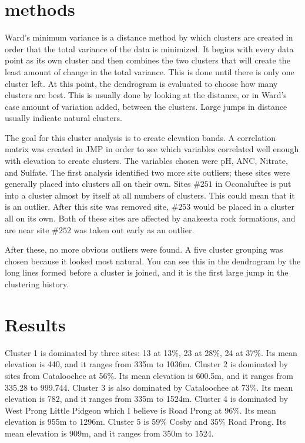 \documentclass[11pt]{article} %
\begin{document}
\section{methods}
Ward’s minimum variance is a distance method by which clusters are created in order that the total variance of the data is minimized.  It begins with every data point as its own cluster and then combines the two clusters that will create the least amount of change in the total variance.  This is done until there is only one cluster left.  At this point, the dendrogram is evaluated to choose how many clusters are best.  This is usually done by looking at the distance, or in Ward’s case amount of variation added, between the clusters.  Large jumps in distance usually indicate natural clusters.

The goal for this cluster analysis is to create elevation bands.  A correlation matrix was created in JMP in order to see which variables correlated well enough with elevation to create clusters.  The variables chosen were pH, ANC, Nitrate, and Sulfate.   The first analysis identified two more site outliers; these sites were generally placed into clusters all on their own.  Sites $\#251$ in Oconaluftee is put into a cluster almost by itself at all numbers of clusters.  This could mean that it is an outlier.  After this site was removed site, $\#253$ would be placed in a cluster all on its own.  Both of these sites are affected by anakeesta rock formations, and are near site $\#252$ was taken out early as an outlier.

After these, no more obvious outliers were found.  A five cluster grouping was chosen because it looked most natural.  You can see this in the dendrogram by the long lines formed before a cluster is joined, and it is the first large jump in the clustering history.

\section{Results}%
Cluster 1 is dominated by three sites: 13 at 13$\%$, 23 at 28$\%$, 24 at 37$\%$.  Its mean elevation is 440, and it ranges from 335m to 1036m.  Cluster 2 is dominated by sites from Cataloochee at 56$\%$.  Its mean elevation is 600.5m, and it ranges from 335.28 to 999.744.  Cluster 3 is also dominated by Cataloochee at 73$\%$. Its mean elevation is 782, and it ranges from 335m to 1524m.  Cluster 4 is dominated by West Prong Little Pidgeon which I believe is Road Prong at 96$\%$.  Its mean elevation is 955m to 1296m.  Cluster 5 is 59$\%$ Cosby and 35$\%$ Road Prong.  Its mean elevation is 909m, and it ranges from 350m to 1524.
\end{document}
